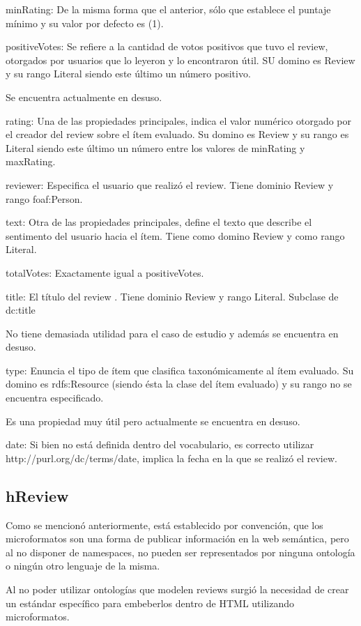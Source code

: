 minRating: De la misma forma que el anterior, sólo que establece el puntaje mínimo y su valor por defecto es (1).


positiveVotes: Se refiere a la cantidad de votos positivos que tuvo el review, otorgados por usuarios que lo leyeron y lo encontraron 
útil. SU domino es Review y su rango Literal siendo este último un número positivo.


Se encuentra actualmente en desuso.


rating: Una de las propiedades principales, indica el valor numérico otorgado por el creador del review sobre el ítem evaluado. 
Su domino es Review y su rango es Literal siendo este último un número entre los valores de minRating y maxRating.


reviewer: Especifica el usuario que realizó el review. Tiene dominio Review y rango foaf:Person. 



text: Otra de las propiedades principales, define el texto que describe el sentimento del usuario hacia el ítem. Tiene como 
domino Review y como rango Literal.


totalVotes: Exactamente igual a positiveVotes.


title: El título del review . Tiene dominio Review y rango Literal. Subclase de dc:title


No tiene demasiada utilidad para el caso de estudio y además se encuentra en desuso.


type: Enuncia el tipo de ítem que clasifica taxonómicamente al ítem evaluado. Su domino es rdfs:Resource (siendo ésta la clase del ítem evaluado)  
y su rango no se encuentra especificado. 


Es una propiedad muy útil pero actualmente se encuentra en desuso.


date: Si bien no está definida dentro del vocabulario, es correcto utilizar http://purl.org/dc/terms/date, implica la fecha en la 
que se realizó el review.


\subsection{hReview}

Como se mencionó anteriormente, está establecido por convención, que los microformatos son una forma de publicar información en la 
web semántica, pero al no disponer de namespaces, no pueden ser representados por ninguna ontología o ningún otro lenguaje de la misma. 


Al no poder utilizar ontologías que modelen reviews surgió la necesidad de crear un estándar específico para embeberlos dentro de HTML 
utilizando microformatos.

